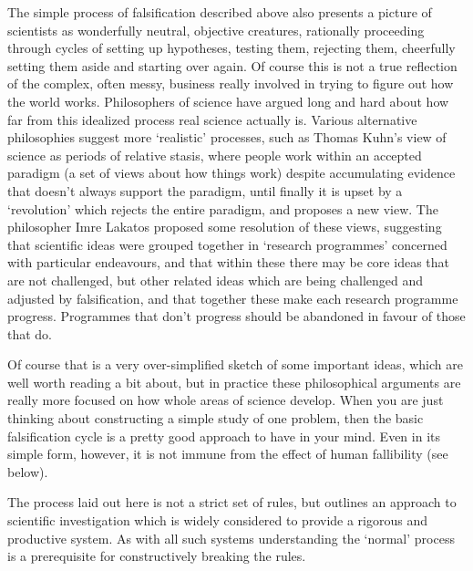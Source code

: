 \documentclass[]{book}
\begin{document}
The simple process of falsification described above also presents a
picture of scientists as wonderfully neutral, objective creatures,
rationally proceeding through cycles of setting up hypotheses, testing
them, rejecting them, cheerfully setting them aside and starting over
again. Of course this is not a true reflection of the complex, often
messy, business really involved in trying to figure out how the world
works. Philosophers of science have argued long and hard about how far
from this idealized process real science actually is. Various
alternative philosophies suggest more `realistic' processes, such as
Thomas Kuhn's view of science as periods of relative stasis, where
people work within an accepted paradigm (a set of views about how things
work) despite accumulating evidence that doesn't always support the
paradigm, until finally it is upset by a `revolution' which rejects the
entire paradigm, and proposes a new view. The philosopher Imre Lakatos
proposed some resolution of these views, suggesting that scientific
ideas were grouped together in `research programmes' concerned with
particular endeavours, and that within these there may be core ideas
that are not challenged, but other related ideas which are being
challenged and adjusted by falsification, and that together these make
each research programme progress. Programmes that don't progress should
be abandoned in favour of those that do.

Of course that is a very over-simplified sketch of some important ideas,
which are well worth reading a bit about, but in practice these
philosophical arguments are really more focused on how whole areas of
science develop. When you are just thinking about constructing a simple
study of one problem, then the basic falsification cycle is a pretty
good approach to have in your mind. Even in its simple form, however, it
is not immune from the effect of human fallibility (see below).

The process laid out here is not a strict set of rules, but outlines an
approach to scientific investigation which is widely considered to
provide a rigorous and productive system. As with all such systems
understanding the `normal' process is a prerequisite for constructively
breaking the rules.
\end{document}

